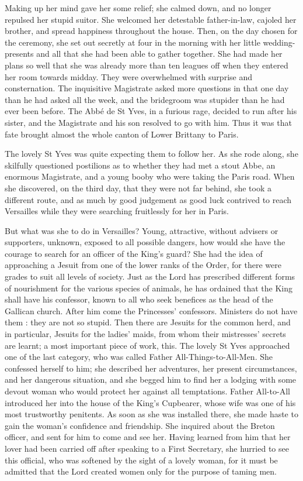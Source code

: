 \documentclass{article}
\begin{document}
\begin{center}
Making up her mind gave her some relief; she calmed down, and no longer repulsed 
her stupid suitor. She welcomed her detestable father-in-law, cajoled her brother, 
and spread happiness throughout the house. Then, on the day chosen for the ceremony, 
she set out secretly at four in the morning with her little wedding-presents and 
all that she had been able to gather together. She had made her plans so well that 
she was already more than ten leagues off when they entered her room towards midday. 
They were overwhelmed with surprise and consternation. The inquisitive Magistrate 
asked more questions in that one day than he had asked all the week, and the bridegroom 
was stupider than he had ever been before. The Abbé de St Yves, in a furious rage, 
decided to run after his sister, and the Magistrate and his son resolved to go 
with him. Thus it was that fate brought almost the whole canton of Lower Brittany 
to Paris. 

The lovely St Yves was quite expecting them to follow her. As she rode along, she 
skilfully questioned postilions as to whether they had met a stout Abbe, an enormous 
Magistrate, and a young booby who were taking the Paris road. When she discovered, 
on the third day, that they were not far behind, she took a different route, and 
as much by good judgement as good luck contrived to reach Versailles while they 
were searching fruitlessly for her in Paris. 

But what was she to do in Versailles? Young, attractive, without advisers or supporters, 
unknown, exposed to all possible dangers, how would she have the courage to search 
for an officer of the King's guard? She had the idea of approaching a Jesuit from 
one of the lower ranks of the Order, for there were grades to suit all levels of 
society. Just as the Lord has prescribed different forms of nourishment for the 
various species of animals, he has ordained that the King shall have his confessor, 
known to all who seek benefices as the head of the Gallican church. After him come 
the Princesses' confessors. Ministers do not have them : they are not so stupid. 
Then there are Jesuits for the common herd, and in particular, Jesuits for the 
ladies' maids, from whom their mistresses' secrets are learnt; a most important 
piece of work, this. The lovely St Yves approached one of the last category, who 
was called Father All-Things-to-All-Men. She confessed herself to him; she described 
her adventures, her present circumstances, and her dangerous situation, and she 
begged him to find her a lodging with some devout woman who would protect her against 
all temptations. Father All-to-All introduced her into the house of the King's 
Cupbearer, whose wife was one of his most trustworthy penitents. As soon as she 
was installed there, she made haste to gain the woman's confidence and friendship. 
She inquired about the Breton officer, and sent for him to come and see her. Having 
learned from him that her lover had been carried off after speaking to a First 
Secretary, she hurried to see this official, who was softened by the sight of a 
lovely woman, for it must be admitted that the Lord created women only for the 
purpose of taming men. 


\end{center}
\end{document}
